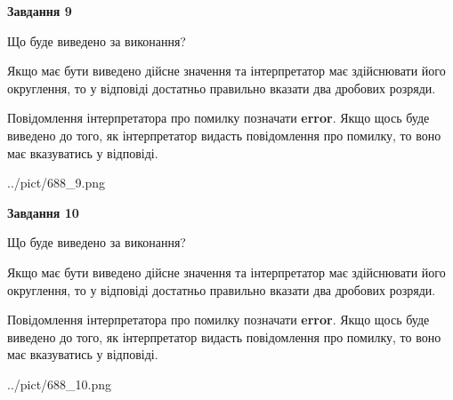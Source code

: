 \documentclass[12pt, ukrainian]{article}
\begin{document}
{\begin {Large}
{\begin {center}\textbf{Завдання 9}\end {center}}\par
Що буде виведено за виконання? \par

Якщо має бути виведено дійсне значення та інтерпретатор має здійснювати його округлення, 
то у відповіді достатньо правильно вказати два дробових розряди.

Повідомлення інтерпретатора про помилку позначати \textbf{error}.
Якщо щось буде виведено до того, як інтерпретатор видасть повідомлення про помилку, 
то воно має вказуватись у відповіді. \par

\begin{center}
	{../pict/688_9.png}
\end{center}
\newpage

{\begin {center}\textbf{Завдання 10}\end {center}}\par
Що буде виведено за виконання? \par

Якщо має бути виведено дійсне значення та інтерпретатор має здійснювати його округлення, 
то у відповіді достатньо правильно вказати два дробових розряди.

Повідомлення інтерпретатора про помилку позначати \textbf{error}.
Якщо щось буде виведено до того, як інтерпретатор видасть повідомлення про помилку, 
то воно має вказуватись у відповіді. \par

\begin{center}
	{../pict/688_10.png}
\end{center}
\newpage

\end {Large}}
\end{document}
